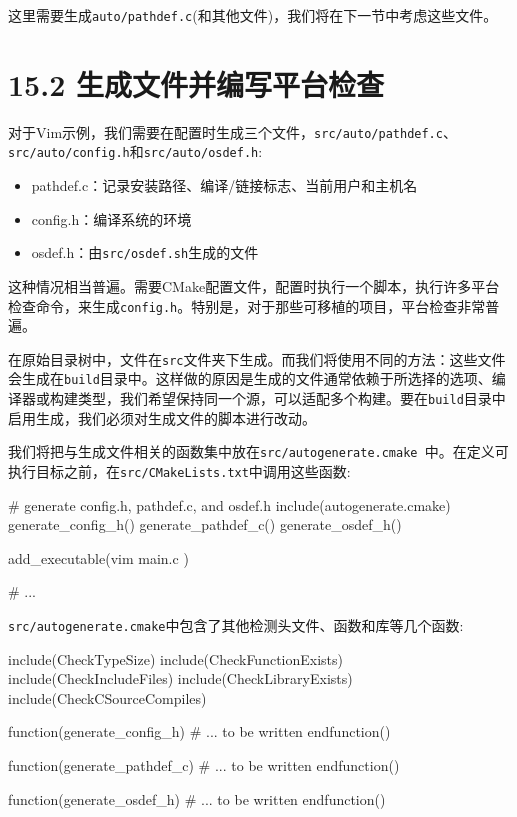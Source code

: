 这里需要生成\texttt{auto/pathdef.c}(和其他文件)，我们将在下一节中考虑这些文件。


\section{15.2 生成文件并编写平台检查}

对于Vim示例，我们需要在配置时生成三个文件，\texttt{src/auto/pathdef.c}、\texttt{src/auto/config.h}和\texttt{src/auto/osdef.h}:

\begin{itemize}
\item pathdef.c：记录安装路径、编译/链接标志、当前用户和主机名

\item config.h：编译系统的环境

\item osdef.h：由\texttt{src/osdef.sh}生成的文件

\end{itemize}

这种情况相当普遍。需要CMake配置文件，配置时执行一个脚本，执行许多平台检查命令，来生成\texttt{config.h}。特别是，对于那些可移植的项目，平台检查非常普遍。

在原始目录树中，文件在\texttt{src}文件夹下生成。而我们将使用不同的方法：这些文件会生成在\texttt{build}目录中。这样做的原因是生成的文件通常依赖于所选择的选项、编译器或构建类型，我们希望保持同一个源，可以适配多个构建。要在\texttt{build}目录中启用生成，我们必须对生成文件的脚本进行改动。


我们将把与生成文件相关的函数集中放在\texttt{src/autogenerate.cmake }中。在定义可执行目标之前，在\texttt{src/CMakeLists.txt}中调用这些函数:

\begin{codebox}[cmake]
# generate config.h, pathdef.c, and osdef.h
include(autogenerate.cmake)
generate_config_h()
generate_pathdef_c()
generate_osdef_h()

add_executable(vim
    main.c
  )
  
# ...
\end{codebox}

\texttt{src/autogenerate.cmake}中包含了其他检测头文件、函数和库等几个函数:

\begin{codebox}[cmake]
include(CheckTypeSize)
include(CheckFunctionExists)
include(CheckIncludeFiles)
include(CheckLibraryExists)
include(CheckCSourceCompiles)

function(generate_config_h)
    # ... to be written
endfunction()

function(generate_pathdef_c)
    # ... to be written
endfunction()

function(generate_osdef_h)
    # ... to be written
endfunction()
\end{codebox}

